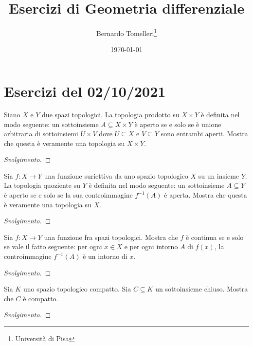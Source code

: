 \documentclass{article}[a4paper, 12pt, italian]
\title{Esercizi di Geometria differenziale}
\author{Bernardo Tomelleri\thanks{Università di Pisa}}
\date{\today}
\begin{document}
\maketitle

\section{Esercizi del 02/10/2021}
\begin{exercise}
Siano $X$ e $Y$ due spazi topologici. La topologia prodotto su $X \times Y$
è definita nel modo seguente: un sottoinsieme $A \subseteq X \times Y$ è
aperto se e solo se è unione arbitraria di sottoinsiemi $U \times V$ dove
$U \subseteq X$ e $V \subseteq Y$ sono entrambi aperti. Mostra che questa è
veramente una topologia su $X \times Y$.
\begin{proof}[Svolgimento]

\end{proof}
\end{exercise}

\begin{exercise}
Sia $f: X \to Y$ una funzione suriettiva da uno spazio topologico $X$ su
un insieme $Y.$ La topologia quoziente su $Y$ è definita nel modo seguente:
un sottoinsieme $A \subseteq Y$ è aperto se e solo se la sua controimmagine
$f^{-1}(A)$ è aperta. Mostra che questa è veramente una topologia su $X$.
\begin{proof}[Svolgimento]

\end{proof}
\end{exercise}

\begin{exercise}
Sia $f: X \to Y$ una funzione fra spazi topologici. Mostra che $f$ è
continua se e solo se vale il fatto seguente: per ogni $x \in X$ e per ogni
intorno $A$ di $f(x)$, la controimmagine $f^{-1}(A)$ è un intorno di $x$.
\begin{proof}[Svolgimento]

\end{proof}
\end{exercise}


\begin{exercise}
Sia $K$ uno spazio topologico compatto. Sia $C \subseteq K$ un sottoinsieme
chiuso. Mostra che $C$ è compatto.
\begin{proof}[Svolgimento]

\end{proof}
\end{exercise}
\end{document}
